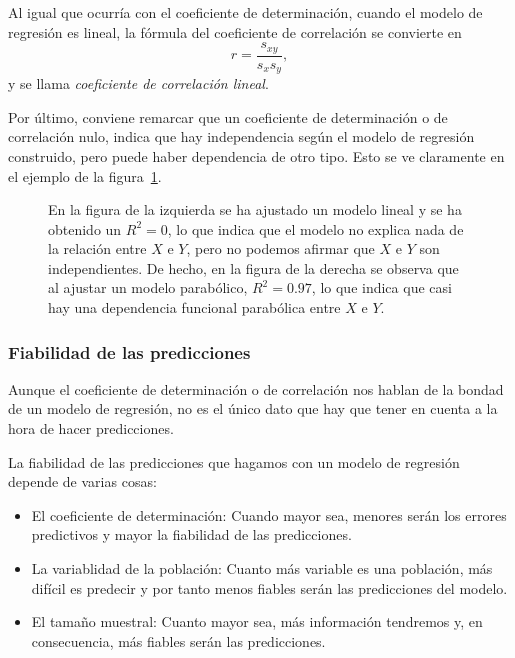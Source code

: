Al igual que ocurría con el coeficiente de determinación, cuando el modelo de regresión es lineal, la fórmula del
coeficiente de correlación se convierte en
\[
r=\frac{s_{xy}}{s_x s_y},
\]
y se llama \emph{coeficiente de correlación lineal}.

Por último, conviene remarcar que un coeficiente de determinación o de correlación nulo, indica que hay independencia
según el modelo de regresión construido, pero puede haber dependencia de otro tipo.
Esto se ve claramente en el ejemplo de  la figura~\ref{g:dependenciaparabolica}.

\begin{figure}[h!]
\centering {}\qquad
{}
\caption{En la figura de la izquierda se ha ajustado un modelo lineal y se ha obtenido un $R^2=0$, lo que indica que el
modelo no explica nada de la relación entre $X$ e $Y$, pero no podemos afirmar que $X$ e $Y$ son independientes. De
hecho, en la figura de la derecha se observa que al ajustar un modelo parabólico, $R^2=0.97$, lo que indica que casi hay
una dependencia funcional parabólica entre $X$ e $Y$.}
\label{g:dependenciaparabolica}
\end{figure}


\subsubsection{Fiabilidad de las predicciones}
Aunque el coeficiente de determinación o de correlación nos hablan de la bondad de un modelo de regresión, no es el
único dato que hay que tener en cuenta a la hora de hacer predicciones.

La fiabilidad de las predicciones que hagamos con un modelo de regresión depende de varias cosas:
\begin{itemize}
\item El coeficiente de determinación: Cuando mayor sea, menores serán los errores predictivos y mayor la fiabilidad de
las predicciones.
\item La variablidad de la población: Cuanto más variable es una población, más difícil es predecir y por tanto menos
fiables serán las predicciones del modelo.
\item El tamaño muestral: Cuanto mayor sea, más información tendremos y, en consecuencia, más fiables serán las
predicciones.
\end{itemize} 

